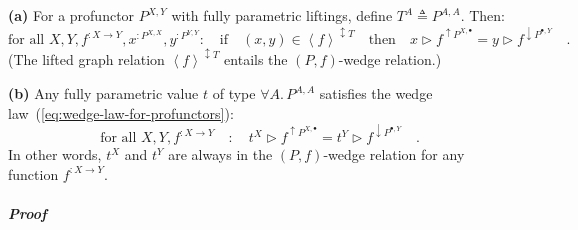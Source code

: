 \textbf{(a)} For a profunctor $P^{X,Y}$ with fully parametric liftings,
define $T^{A}\triangleq P^{A,A}$. Then:
\[
\text{for all }X,Y,f^{:X\rightarrow Y},x^{:P^{X,X}},y^{:P^{Y,Y}}:\quad\text{if}\quad(x,y)\in\left<f\right>^{\updownarrow T}\quad\text{then}\quad x\triangleright f^{\uparrow P^{X,\bullet}}=y\triangleright f^{\downarrow P^{\bullet,Y}}\quad.
\]
(The lifted graph relation $\left<f\right>^{\updownarrow T}$ entails
the $\left(P,f\right)$-wedge relation.)

\textbf{(b)} Any fully parametric value $t$ of type $\forall A.\,P^{A,A}$
satisfies the wedge law~(\ref{eq:wedge-law-for-profunctors}):
\[
\text{for all }X,Y,f^{:X\rightarrow Y}\quad:\quad t^{X}\triangleright f^{\uparrow P^{X,\bullet}}=t^{Y}\triangleright f^{\downarrow P^{\bullet,Y}}\quad.
\]
In other words, $t^{X}$ and $t^{Y}$ are always in the $(P,f)$-wedge
relation for any function $f^{:X\rightarrow Y}$.

\subparagraph{Proof}

